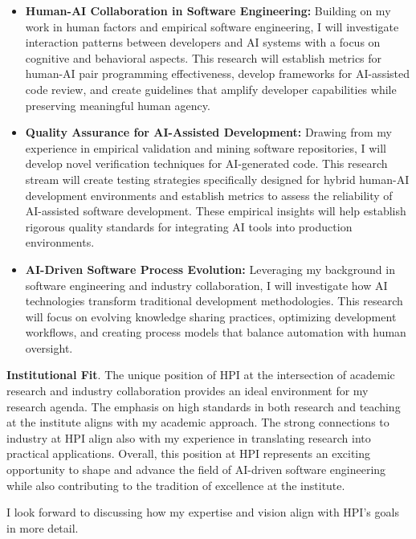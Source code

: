 \begin{itemize}
\item \textbf{Human-AI Collaboration in Software Engineering:} Building on my work in human factors and empirical software engineering, I will investigate interaction patterns between developers and AI systems with a focus on cognitive and behavioral aspects. This research will establish metrics for human-AI pair programming effectiveness, develop frameworks for AI-assisted code review, and create guidelines that amplify developer capabilities while preserving meaningful human agency.
\item \textbf{Quality Assurance for AI-Assisted Development:} Drawing from my experience in empirical validation and mining software repositories, I will develop novel verification techniques for AI-generated code. This research stream will create testing strategies specifically designed for hybrid human-AI development environments and establish metrics to assess the reliability of AI-assisted software development. These empirical insights will help establish rigorous quality standards for integrating AI tools into production environments.
\item \textbf{AI-Driven Software Process Evolution:} Leveraging my background in software engineering and industry collaboration, I will investigate how AI technologies transform traditional development methodologies. This research will focus on evolving knowledge sharing practices, optimizing development workflows, and creating process models that balance automation with human oversight.
\end{itemize}

\textbf{Institutional Fit}. 
The unique position of HPI at the intersection of academic research and industry collaboration provides an ideal environment for my research agenda. 
The emphasis on high standards in both research and teaching at the institute aligns with my academic approach.
The strong connections to industry at HPI align also with my experience in translating research into practical applications. 
Overall, this position at HPI represents an exciting opportunity to shape and advance the field of AI-driven software engineering while also contributing to the tradition of excellence at the institute.

I look forward to discussing how my expertise and vision align with HPI's goals in more detail.